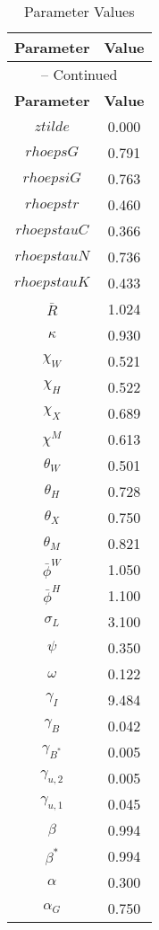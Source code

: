 \begin{center}
\begin{longtable}{cc}
\caption{Parameter Values}\\%
\toprule%
\multicolumn{1}{c}{\textbf{Parameter}} &
\multicolumn{1}{c}{\textbf{Value}}  \\%
\midrule%
\endfirsthead
\multicolumn{2}{c}{{\tablename} \thetable{} -- Continued}\\%
\midrule%
\multicolumn{1}{c}{\textbf{Parameter}} &
\multicolumn{1}{c}{\textbf{Value}} \\%
\midrule%
\endhead
$ztilde$ 	 & 	 0.000 \\
$rhoepsG$ 	 & 	 0.791 \\
$rhoepsiG$ 	 & 	 0.763 \\
$rhoepstr$ 	 & 	 0.460 \\
$rhoepstauC$ 	 & 	 0.366 \\
$rhoepstauN$ 	 & 	 0.736 \\
$rhoepstauK$ 	 & 	 0.433 \\
$\bar{R}$ 	 & 	 1.024 \\
$\kappa$ 	 & 	 0.930 \\
$\chi_W$ 	 & 	 0.521 \\
$\chi_H$ 	 & 	 0.522 \\
$\chi_X$ 	 & 	 0.689 \\
$\chi^M$ 	 & 	 0.613 \\
$\theta_W$ 	 & 	 0.501 \\
$\theta_H$ 	 & 	 0.728 \\
$\theta_X$ 	 & 	 0.750 \\
$\theta_M$ 	 & 	 0.821 \\
$\bar{\phi}^W$ 	 & 	 1.050 \\
$\bar{\phi}^H$ 	 & 	 1.100 \\
$\sigma_L$ 	 & 	 3.100 \\
$\psi$ 	 & 	 0.350 \\
$\omega$ 	 & 	 0.122 \\
$\gamma_I$ 	 & 	 9.484 \\
$\gamma_{B}$ 	 & 	 0.042 \\
$\gamma_{B^*}$ 	 & 	 0.005 \\
$\gamma_{u,2}$ 	 & 	 0.005 \\
$\gamma_{u,1}$ 	 & 	 0.045 \\
$\beta$ 	 & 	 0.994 \\
$\beta^*$ 	 & 	 0.994 \\
$\alpha$ 	 & 	 0.300 \\
$\alpha_G$ 	 & 	 0.750 \\

\end{longtable}
\end{center}
